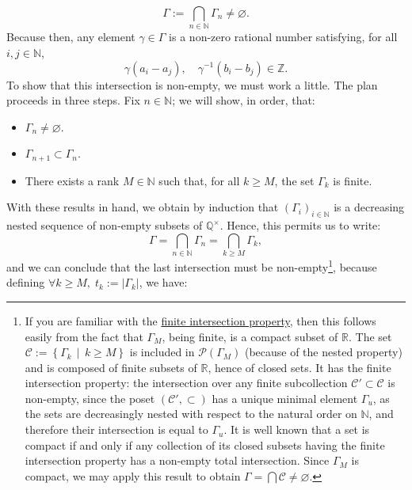 \begin{solution}
    \[
        \Gamma := \bigcap_{n \in \mathbb{N}} \Gamma_n \neq \varnothing.
    \]
    Because then, any element \( \gamma \in \Gamma \) is a non-zero rational number satisfying, for all \( i, j \in \mathbb{N} \),
    \[
        \gamma\left( a_i - a_j \right), \quad \gamma^{-1}\left( b_i - b_j \right) \in \mathbb{Z}.
    \]
    To show that this intersection is non-empty, we must work a little. The plan proceeds in three steps. Fix \( n \in \mathbb{N} \); we will show, in order, that:
    \begin{itemize}
        \item \( \Gamma_n \neq \varnothing \).
        \item \( \Gamma_{n+1} \subset \Gamma_n \).
        \item There exists a rank \( M \in \mathbb{N} \) such that, for all \( k \geq M \), the set \( \Gamma_k \) is finite.
    \end{itemize}
    With these results in hand, we obtain by induction that \( \left( \Gamma_i \right)_{i \in \mathbb{N}} \) is a decreasing nested sequence of non-empty subsets of \( \mathbb{Q}^{\times} \). Hence, this permits us to write:
    \[
        \Gamma = \bigcap_{n \in \mathbb{N}} \Gamma_n = \bigcap_{k \geq M} \Gamma_k,
    \]
    and we can conclude that the last intersection must be non-empty\footnote{If you are familiar with the \href{https://en.wikipedia.org/wiki/Finite_intersection_property}{finite intersection property}, then this follows easily from the fact that \( \Gamma_M \), being finite, is a compact subset of \( \mathbb{R} \). The set \( \mathcal{C} := \left\{ \Gamma_k \,\middle|\, k \geq M \right\} \) is included in \( \mathscr{P} \left( \Gamma_M \right) \) (because of the nested property) and is composed of finite subsets of \( \mathbb{R} \), hence of closed sets. It has the finite intersection property: the intersection over any finite subcollection \( \mathcal{C}' \subset \mathcal{C} \) is non-empty, since the poset \( \left( \mathcal{C}', \subset \right) \) has a unique minimal element \( \Gamma_u \), as the sets are decreasingly nested with respect to the natural order on \( \mathbb{N} \), and therefore their intersection is equal to \( \Gamma_u \). It is well known that a set is compact if and only if any collection of its closed subsets having the finite intersection property has a non-empty total intersection. Since \( \Gamma_M \) is compact, we may apply this result to obtain \( \Gamma = \bigcap \mathcal{C} \neq \varnothing \).}, because defining \( \forall k \geq M,\; t_k := \left| \Gamma_k \right| \), we have:

\end{solution}
